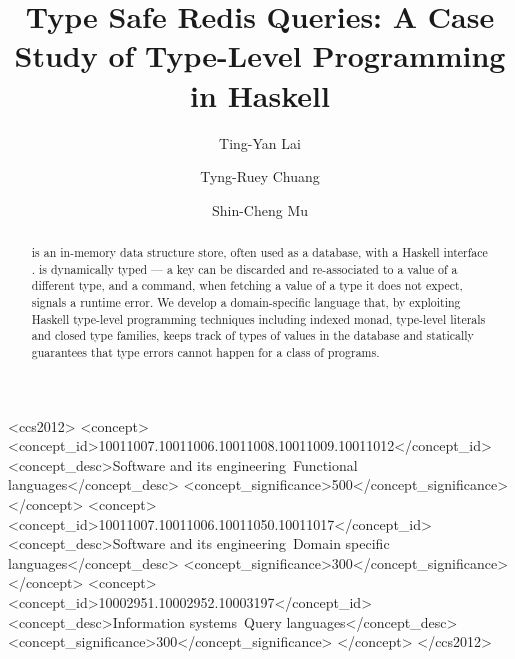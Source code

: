 \documentclass[sigplan, screen, 9pt]{acmart}
\begin{document}
\title{Type Safe Redis Queries: A Case Study of Type-Level Programming in Haskell}

\author{Ting-Yan Lai}

\author{Tyng-Ruey Chuang}

\author{Shin-Cheng Mu}

\begin{abstract}
\Redis{} is an in-memory data structure store, often used as a database, with a
Haskell interface \Hedis{}. \Redis{} is dynamically typed --- a key can be
discarded and re-associated to a value of a different type, and a command,
when fetching a value of a type it does not expect, signals a runtime error. We
develop a domain-specific language that, by exploiting Haskell type-level
programming techniques including indexed monad, type-level literals and closed
type families, keeps track of types of values in the database and statically
guarantees that type errors cannot happen for a class of \Redis{} programs.
\end{abstract}

\begin{CCSXML}
<ccs2012>
<concept>
<concept_id>10011007.10011006.10011008.10011009.10011012</concept_id>
<concept_desc>Software and its engineering~Functional languages</concept_desc>
<concept_significance>500</concept_significance>
</concept>
<concept>
<concept_id>10011007.10011006.10011050.10011017</concept_id>
<concept_desc>Software and its engineering~Domain specific languages</concept_desc>
<concept_significance>300</concept_significance>
</concept>
<concept>
<concept_id>10002951.10002952.10003197</concept_id>
<concept_desc>Information systems~Query languages</concept_desc>
<concept_significance>300</concept_significance>
</concept>
</ccs2012>
\end{CCSXML}
\end{document}
